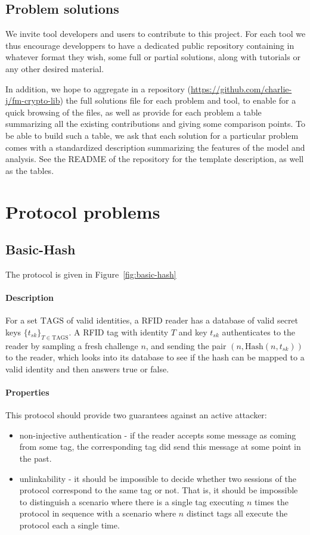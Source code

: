 \documentclass{article}
\newcommand{\sfsk}{\mathit{sk}}
\newcommand{\kwf}[1]{\mathrm{#1}}
\newcommand{\hash}{\kwf{Hash}}
\newcommand{\tagset}{\kwf{TAGS}}
\begin{document}
\subsection{Problem solutions}

We invite tool developers and users to contribute to this project. For each tool we thus encourage developpers to have a dedicated public repository containing in whatever format they wish, some full or partial solutions, along with tutorials or any other desired material.


In addition, we hope to aggregate in a repository (\url{https://github.com/charlie-j/fm-crypto-lib}) the full solutions file for each problem and tool, to enable for a quick browsing of the files, as well as provide for each problem a table summarizing all the existing contributions and giving some comparison points. To be able to build such a table, we ask that each solution for a particular problem comes with a standardized description summarizing the features of the model and analysis. See the README of the repository for the template description, as well as the tables.

\section{Protocol problems}


\subsection{Basic-Hash}\label{prob:basic-hash}

The protocol is given in Figure~\ref{fig:basic-hash}

\paragraph{Description} For a set $\tagset$ of valid identities, a RFID reader has a database of valid secret keys $\{t_\sfsk\}_{T \in \tagset}$. A RFID tag with identity $T$ and key $t_\sfsk$ authenticates to the reader by sampling a fresh challenge $n$, and sending the pair $(n,\hash(n,t_\sfsk))$ to the reader, which looks into its database to see if the hash can be mapped to a valid identity and then answers true or false.


\paragraph{Properties} This protocol should provide two guarantees against an active attacker:
\begin{itemize}
\item non-injective authentication - if the reader accepts some message as coming from some tag, the corresponding tag did send this message at some point in the past.
\item unlinkability - it should be impossible to decide whether two sessions of the protocol correspond to the same tag or not. That is, it should be impossible to distinguish a scenario where there is a single tag executing $n$ times the protocol in sequence with a scenario where $n$ distinct tags all execute the protocol each a single time. 
\end{itemize}
\end{document}
